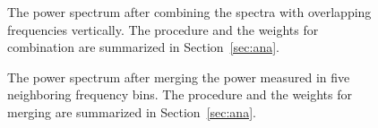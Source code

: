 \begin{figure}[htbp]                                                                                                  
    \centering                                                                                                                       
    \caption{The power spectrum after combining the spectra with overlapping 
frequencies vertically. The procedure and the weights for combination 
are summarized in Section~\ref{sec:ana}.}                
\label{fig:faxioncombine}                                                                                                            
\end{figure}                       


\begin{figure}[htbp]                                                                                                  
    \centering                                                                                                                       
    \caption{The power spectrum after merging the power measured in five neighboring 
 frequency bins. The procedure and the weights for merging 
are summarized in Section~\ref{sec:ana}.}                
\label{fig:faxionmerge}    
\end{figure}                       

   
